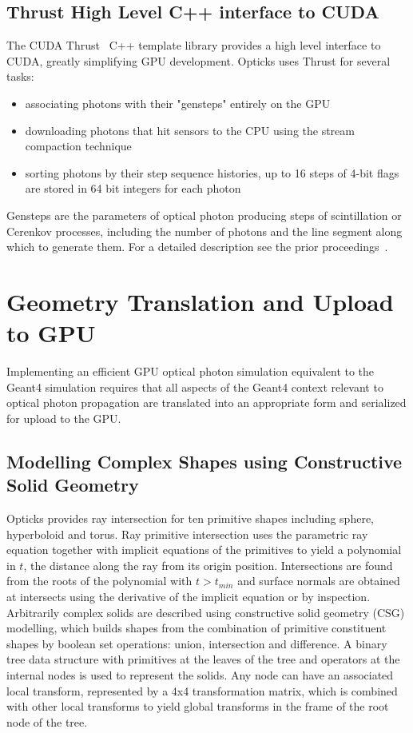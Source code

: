 \documentclass{webofc}
\begin{document}
\subsection{Thrust High Level C++ interface to CUDA}
%
The CUDA Thrust~\cite{thrust} C++ template library provides a high level interface to CUDA, 
greatly simplifying GPU development. Opticks uses Thrust for several tasks:
%
\begin{itemize}
\item associating photons with their "gensteps" entirely on the GPU
\item downloading photons that hit sensors to the CPU using the stream compaction technique
\item sorting photons by their step sequence histories, up to 16 steps of 4-bit flags are stored in 64 bit integers for each photon
\end{itemize} 
%
Gensteps are the parameters of optical photon producing steps of scintillation or Cerenkov processes, 
including the number of photons and the line segment along which to generate them.
For a detailed description see the prior proceedings~\cite{chep2016}.
%
\section{Geometry Translation and Upload to GPU}
\label{geometry}
%
Implementing an efficient GPU optical photon simulation equivalent to the Geant4 simulation 
requires that all aspects of the Geant4 context relevant to optical photon propagation are 
translated into an appropriate form and serialized for upload to the GPU.
%
\subsection{Modelling Complex Shapes using Constructive Solid Geometry}
%
Opticks provides ray intersection for ten primitive shapes including sphere, hyperboloid and torus.
Ray primitive intersection uses the parametric ray equation together with implicit equations 
of the primitives to yield a polynomial in $t$, the distance along the ray from its origin position. 
Intersections are found from the roots of the polynomial with $t > t_{min}$ and surface normals are obtained at intersects
using the derivative of the implicit equation or by inspection.
%
Arbitrarily complex solids are described using constructive solid geometry (CSG) modelling, 
which builds shapes from the combination of primitive constituent shapes by boolean set operations: union, intersection and difference.
A binary tree data structure with primitives at the leaves of the tree and operators at the internal nodes is used
to represent the solids. Any node can have an associated local transform, represented by a 4x4 transformation matrix, which 
is combined with other local transforms to yield global transforms in the frame of the root node of the tree.
%
\end{document}
